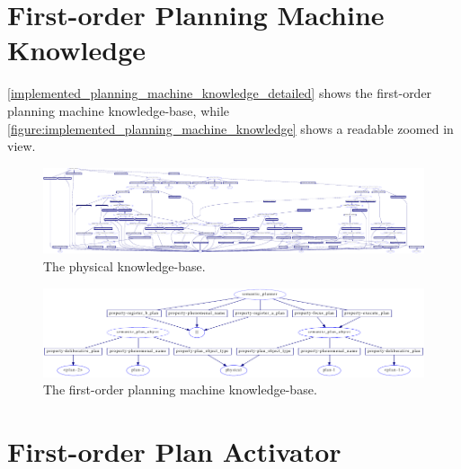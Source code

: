 \section{First-order Planning Machine Knowledge}

{\mbox{\autoref{implemented_planning_machine_knowledge_detailed}}}
shows the first-order planning machine knowledge-base, while
{\mbox{\autoref{figure:implemented_planning_machine_knowledge}}} shows
a readable zoomed in view.
\begin{figure}
\begin{center}
\includegraphics[width=24cm]{gfx/implemented_planning_machine_knowledge_detailed}
\end{center}
\hspace{4cm}\parbox{15cm}{\caption[The physical knowledge-base.]{The
    physical
    knowledge-base.}\label{figure:implemented_planning_machine_knowledge_detailed}}
\end{figure}
\begin{figure}
\begin{center}
\includegraphics[width=14cm]{gfx/implemented_planning_machine_knowledge}
\end{center}
\caption[The first-order planning machine knowledge-base.]{The
  first-order planning machine knowledge-base.}
\label{figure:implemented_first_order_planning_machine_knowledge}
\end{figure}

\section{First-order Plan Activator}

